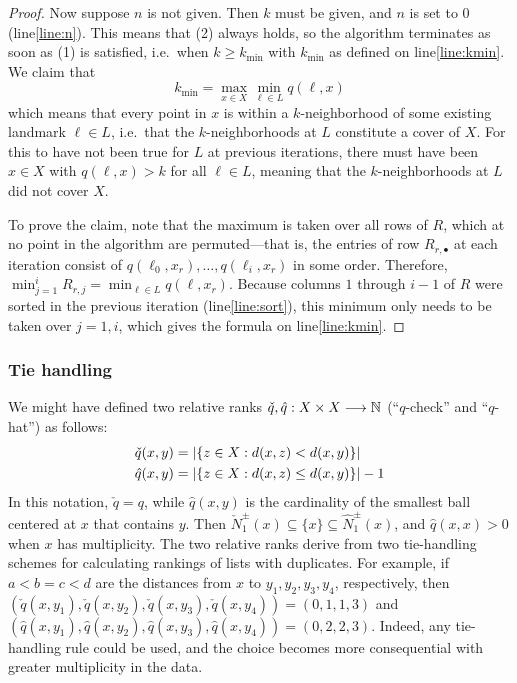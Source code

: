 \documentclass{article}
\begin{document}
\begin{proof}
Now suppose $n$ is not given.
Then $k$ must be given, and $n$ is set to $0$ (line\nbs\ref{line:n}).
This means that (2) always holds, so the algorithm terminates as soon as (1) is satisfied, i.e.\ when $k \geq k_{\min}$ with $k_{\min}$ as defined on line\nbs\ref{line:kmin}.
We claim that
\[ k_{\min} = \max_{x \in X}{ \min_{\ell \in L}{ q(\ell, x) } } \]
which means that every point in $x$ is within a $k$-neighborhood of some existing landmark $\ell \in L$, i.e.\ that the $k$-neighborhoods at $L$ constitute a cover of $X$.
For this to have not been true for $L$ at previous iterations, there must have been $x \in X$ with $q(\ell, x) > k$ for all $\ell \in L$, meaning that the $k$-neighborhoods at $L$ did not cover $X$.

To prove the claim, note that the maximum is taken over all rows of $R$, which at no point in the algorithm are permuted---that is, the entries of row $R_{r,\bullet}$ at each iteration consist of $q(\ell_0,x_r),\ldots,q(\ell_i,x_r)$ in some order.
Therefore, $\min_{j=1}^{i}{R_{r,j}} = \min_{\ell \in L}{ q(\ell, x_r) }$.
Because columns $1$ through $i-1$ of $R$ were sorted in the previous iteration (line\nbs\ref{line:sort}), this minimum only needs to be taken over $j=1,i$, which gives the formula on line\nbs\ref{line:kmin}.
\end{proof}

\hypertarget{tie-handling}{%
\subsubsection{Tie handling}\label{tie-handling}}

We might have defined two relative ranks
\(\check{q}, \hat{q} : X \times X \longrightarrow \mathbb{N}\) (``\(q\)-check''
and ``\(q\)-hat'') as follows: \begin{align*}
& \check{q}(x,y)=\abs{\{z\in X \where d(x,z)<d(x,y)\}} \\%
& \hat{q}(x,y)=\abs{\{z\in X \where d(x,z)\leq d(x,y)\}} - 1
\end{align*} In this notation, \(\check{q}=q\), while \(\hat{q}(x,y)\)
is the cardinality of the smallest ball centered at \(x\) that contains
\(y\). Then
\(\check{N}^\pm_1(x) \subseteq \{x\} \subseteq \hat{N}^\pm_1(x)\), and
\(\hat{q}(x,x)>0\) when \(x\) has multiplicity. The two relative ranks
derive from two tie-handling schemes for calculating rankings of lists
with duplicates. For example, if \(a<b=c<d\) are the distances from
\(x\) to \(y_1,y_2,y_3,y_4\), respectively, then
\((\check{q}(x,y_1),\check{q}(x,y_2),\check{q}(x,y_3),\check{q}(x,y_4))=(0,1,1,3)\)
and
\((\hat{q}(x,y_1),\hat{q}(x,y_2),\hat{q}(x,y_3),\hat{q}(x,y_4))=(0,2,2,3)\).
Indeed, any tie-handling rule could be used, and the choice becomes more
consequential with greater multiplicity in the data.
\end{document}
